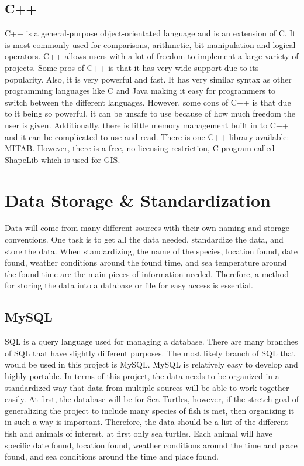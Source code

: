 \documentclass[onecolumn, draftclsnofoot,10pt, compsoc]{IEEEtran}
\begin{document}
    \subsection{C++}
    C++ is a general-purpose object-orientated language and is an extension of C. It is most commonly used for comparisons, arithmetic, bit manipulation and logical operators. C++ allows users with a lot of freedom to implement a large variety of projects\cite{cppsite}. Some pros of C++ is that it has very wide support due to its popularity. Also, it is very powerful and fast. It has very similar syntax as other programming languages like C and Java making it easy for programmers to switch between the different languages. However, some cons of C++ is that due to it being so powerful, it can be unsafe to use because of how much freedom the user is given. Additionally, there is little memory management built in to C++ and it can be complicated to use and read\cite{cppproscons}. There is one C++ library available: MITAB. However, there is a free, no licensing restriction, C program called ShapeLib which is used for GIS\cite{cppgis}.
    
\section{Data Storage \& Standardization}
Data will come from many different sources with their own naming and storage conventions. One task is to get all the data needed, standardize the data, and store the data. When standardizing, the name of the species, location found, date found, weather conditions around the found time, and sea temperature around the found time are the main pieces of information needed. Therefore, a method for storing the data into a database or file for easy access is essential. 
    \subsection{MySQL}
    SQL is a query language used for managing a database. There are many branches of SQL that have slightly different purposes. The most likely branch of SQL that would be used in this project is MySQL. MySQL is relatively easy to develop and highly portable\cite{sqlsite}. In terms of this project, the data needs to be organized in a standardized way that data from multiple sources will be able to work together easily. At first, the database will be for Sea Turtles, however, if the stretch goal of generalizing the project to include many species of fish is met, then organizing it in such a way is important. Therefore, the data should be a list of the different fish and animals of interest, at first only sea turtles. Each animal will have specific date found, location found, weather conditions around the time and place found, and sea conditions around the time and place found.
    
\end{document}
